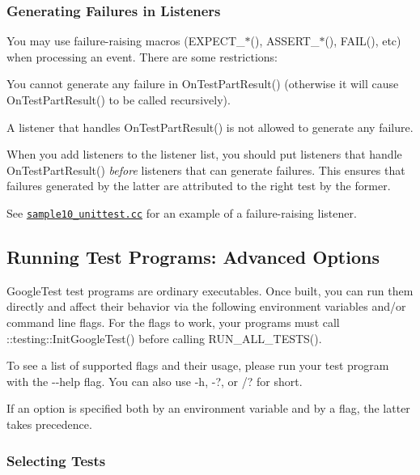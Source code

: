 \subsubsection*{Generating Failures in Listeners}

You may use failure-\/raising macros ({\ttfamily E\+X\+P\+E\+C\+T\+\_\+$\ast$()}, {\ttfamily A\+S\+S\+E\+R\+T\+\_\+$\ast$()}, {\ttfamily F\+A\+I\+L()}, etc) when processing an event. There are some restrictions\+:


\begin{DoxyEnumerate}
\item You cannot generate any failure in {\ttfamily On\+Test\+Part\+Result()} (otherwise it will cause {\ttfamily On\+Test\+Part\+Result()} to be called recursively).
\item A listener that handles {\ttfamily On\+Test\+Part\+Result()} is not allowed to generate any failure.
\end{DoxyEnumerate}

When you add listeners to the listener list, you should put listeners that handle {\ttfamily On\+Test\+Part\+Result()} {\itshape before} listeners that can generate failures. This ensures that failures generated by the latter are attributed to the right test by the former.

See \href{https://github.com/google/googletest/blob/main/googletest/samples/sample10_unittest.cc}{\tt sample10\+\_\+unittest.\+cc} for an example of a failure-\/raising listener.

\subsection*{Running Test Programs\+: Advanced Options}

Google\+Test test programs are ordinary executables. Once built, you can run them directly and affect their behavior via the following environment variables and/or command line flags. For the flags to work, your programs must call {\ttfamily \+::testing\+::\+Init\+Google\+Test()} before calling {\ttfamily R\+U\+N\+\_\+\+A\+L\+L\+\_\+\+T\+E\+S\+T\+S()}.

To see a list of supported flags and their usage, please run your test program with the {\ttfamily -\/-\/help} flag. You can also use {\ttfamily -\/h}, {\ttfamily -\/?}, or {\ttfamily /?} for short.

If an option is specified both by an environment variable and by a flag, the latter takes precedence.

\subsubsection*{Selecting Tests}

